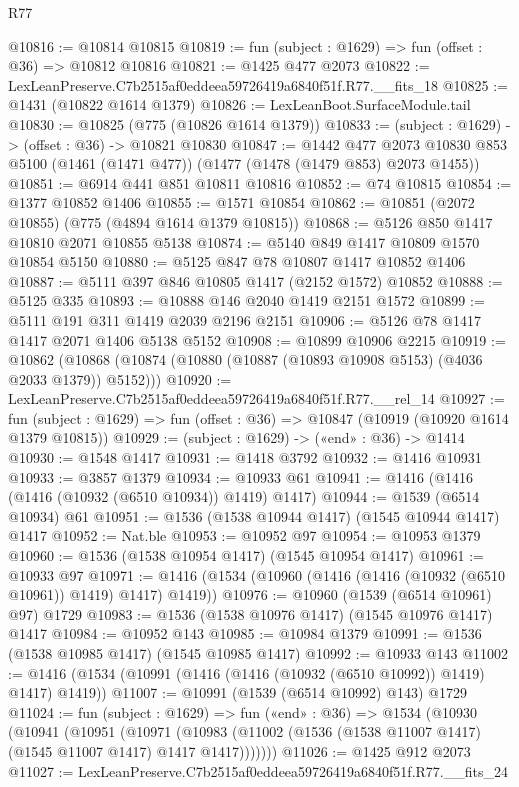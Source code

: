 \begin{lexlean}{R77}
\begin{coremodule}
{{@10816 := @10814 @10815
@10819 := fun (subject : @1629) => fun (offset : @36) => @10812 @10816
@10821 := @1425 @477 @2073
@10822 := LexLeanPreserve.C7b2515af0eddeea59726419a6840f51f.R77.__fits_18
@10825 := @1431 (@10822 @1614 @1379)
@10826 := LexLeanBoot.SurfaceModule.tail
@10830 := @10825 (@775 (@10826 @1614 @1379))
@10833 := (subject : @1629) -> (offset : @36) -> @10821 @10830
@10847 := @1442
    @477
    @2073
    @10830
    @853
    @5100
    (@1461 (@1471 @477))
    (@1477 (@1478 (@1479 @853) @2073 @1455))
@10851 := @6914 @441 @851 @10811 @10816
@10852 := @74 @10815
@10854 := @1377 @10852 @1406
@10855 := @1571 @10854
@10862 := @10851 (@2072 @10855) (@775 (@4894 @1614 @1379 @10815))
@10868 := @5126 @850 @1417 @10810 @2071 @10855 @5138
@10874 := @5140 @849 @1417 @10809 @1570 @10854 @5150
@10880 := @5125 @847 @78 @10807 @1417 @10852 @1406
@10887 := @5111 @397 @846 @10805 @1417 (@2152 @1572) @10852
@10888 := @5125 @335
@10893 := @10888 @146 @2040 @1419 @2151 @1572
@10899 := @5111 @191 @311 @1419 @2039 @2196 @2151
@10906 := @5126 @78 @1417 @1417 @2071 @1406 @5138 @5152
@10908 := @10899 @10906 @2215
@10919 := @10862 (@10868 (@10874 (@10880 (@10887 (@10893 @10908 @5153) (@4036 @2033 @1379)) @5152)))
@10920 := LexLeanPreserve.C7b2515af0eddeea59726419a6840f51f.R77.__rel_14
@10927 := fun (subject : @1629) => fun (offset : @36) => @10847 (@10919 (@10920 @1614 @1379 @10815))
@10929 := (subject : @1629) -> («end» : @36) -> @1414
@10930 := @1548 @1417
@10931 := @1418 @3792
@10932 := @1416 @10931
@10933 := @3857 @1379
@10934 := @10933 @61
@10941 := @1416 (@1416 (@1416 (@10932 (@6510 @10934)) @1419) @1417)
@10944 := @1539 (@6514 @10934) @61
@10951 := @1536 (@1538 @10944 @1417) (@1545 @10944 @1417) @1417
@10952 := Nat.ble
@10953 := @10952 @97
@10954 := @10953 @1379
@10960 := @1536 (@1538 @10954 @1417) (@1545 @10954 @1417)
@10961 := @10933 @97
@10971 := @1416 (@1534 (@10960 (@1416 (@1416 (@10932 (@6510 @10961)) @1419) @1417) @1419))
@10976 := @10960 (@1539 (@6514 @10961) @97) @1729
@10983 := @1536 (@1538 @10976 @1417) (@1545 @10976 @1417) @1417
@10984 := @10952 @143
@10985 := @10984 @1379
@10991 := @1536 (@1538 @10985 @1417) (@1545 @10985 @1417)
@10992 := @10933 @143
@11002 := @1416 (@1534 (@10991 (@1416 (@1416 (@10932 (@6510 @10992)) @1419) @1417) @1419))
@11007 := @10991 (@1539 (@6514 @10992) @143) @1729
@11024 := fun (subject : @1629) =>
  fun («end» : @36) =>
  @1534
    (@10930
      (@10941
        (@10951
          (@10971
            (@10983 (@11002 (@1536 (@1538 @11007 @1417) (@1545 @11007 @1417) @1417 @1417)))))))
@11026 := @1425 @912 @2073
@11027 := LexLeanPreserve.C7b2515af0eddeea59726419a6840f51f.R77.__fits_24
}}
\end{coremodule}
\end{lexlean}
